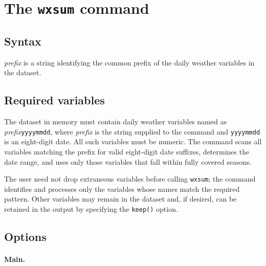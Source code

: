 \section{The \texttt{wxsum} command}

\subsection{Syntax}


\noindent \textit{prefix} is a string identifying the common prefix of the daily weather variables in the dataset.

\subsection{Required variables}

The dataset in memory must contain daily weather variables named as \textit{prefix}\texttt{yyyymmdd}, where \textit{prefix} is the string supplied to the command and \texttt{yyyymmdd} is an eight-digit date. All such variables must be numeric. The command scans all variables matching the prefix for valid eight-digit date suffixes, determines the date range, and uses only those variables that fall within fully covered seasons.

The user need not drop extraneous variables before calling \texttt{wxsum}; the command identifies and processes only the variables whose names match the required pattern. Other variables may remain in the dataset and, if desired, can be retained in the output by specifying the \texttt{keep()} option.

\subsection{Options}

\paragraph{Main.}

